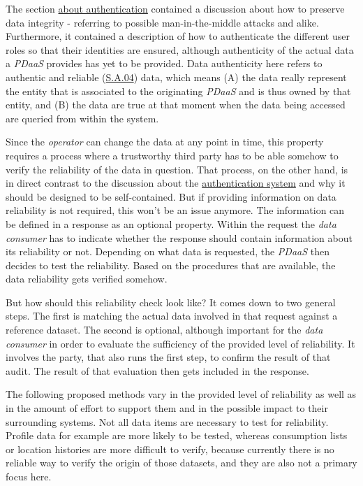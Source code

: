 \documentclass[12pt,english,a4paper,titlepage,cleardoublepage=empty,dottedtoc]{report}
\begin{document}
The section \protect\hyperlink{authentication}{about authentication}
contained a discussion about how to preserve data integrity - referring
to possible man-in-the-middle attacks and alike. Furthermore, it
contained a description of how to authenticate the different user roles
so that their identities are ensured, although authenticity of the
actual data a \emph{PDaaS} provides has yet to be provided. Data
authenticity here refers to authentic and reliable
(\protect\hyperlink{sa04}{S.A.04}) data, which means (A) the data really
represent the entity that is associated to the originating \emph{PDaaS}
and is thus owned by that entity, and (B) the data are true at that
moment when the data being accessed are queried from within the system.

Since the \emph{operator} can change the data at any point in time, this
property requires a process where a trustworthy third party has to be
able somehow to verify the reliability of the data in question. That
process, on the other hand, is in direct contrast to the discussion
about the \protect\hyperlink{authentication}{authentication system} and
why it should be designed to be self-contained. But if providing
information on data reliability is not required, this won't be an issue
anymore. The information can be defined in a response as an optional
property. Within the request the \emph{data consumer} has to indicate
whether the response should contain information about its reliability or
not. Depending on what data is requested, the \emph{PDaaS} then decides
to test the reliability. Based on the procedures that are available, the
data reliability gets verified somehow.

But how should this reliability check look like? It comes down to two
general steps. The first is matching the actual data involved in that
request against a reference dataset. The second is optional, although
important for the \emph{data consumer} in order to evaluate the
sufficiency of the provided level of reliability. It involves the party,
that also runs the first step, to confirm the result of that audit. The
result of that evaluation then gets included in the response.

The following proposed methods vary in the provided level of reliability
as well as in the amount of effort to support them and in the possible
impact to their surrounding systems. Not all data items are necessary to
test for reliability. Profile data for example are more likely to be
tested, whereas consumption lists or location histories are more
difficult to verify, because currently there is no reliable way to
verify the origin of those datasets, and they are also not a primary
focus here.
\end{document}
